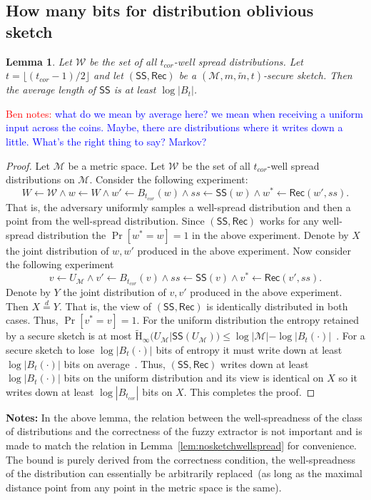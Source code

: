 \documentclass[11pt]{article}
\newcommand{\lemref}[1]{\mbox{Lemma~\ref{#1}}}
\newcommand{\class}[1]{{\ensuremath{\mathsf{#1}}}}
\newcommand{\sketch}{\ensuremath{\class{SS}}\xspace}
\newcommand{\rec}{\ensuremath{\class{Rec}}\xspace}
\newcommand{\Hav}{\tilde{\mathrm{H}}_\infty}
\newtheorem{lemma}[theorem]{Lemma}
\newcommand{\authnote}[2]{{\textcolor{red}{\textsf{#1 notes: }\textcolor{blue}{ #2}}\marginpar{\textcolor{red}{\textbf{!!!!!}}}}}
\newcommand{\authnote}[2]{}
\newcommand{\bnote}[1]{{\authnote{Ben}{#1}}}
\begin{document}
\subsection{How many bits for distribution oblivious sketch} 
\begin{lemma}
Let $\mathcal{W}$ be the set of all $t_{cor}$-well spread distributions.  Let $t = \lfloor (t_{cor}-1)/2\rfloor$ and let $(\sketch, \rec)$ be a $(\mathcal{M}, m, \tilde{m}, t )$-secure sketch.  Then the average length of $\sketch$ is at least $\log |B_{t}|$.
\end{lemma}
\bnote{what do we mean by average here?  we mean when receiving a uniform input across the coins.  Maybe, there are distributions where it writes down a little.  What's the right thing to say?  Markov?}
\begin{proof}
Let $\mathcal{M}$ be a metric space.
Let $\mathcal{W}$ be the set of all $t_{cor}$-well spread distributions on $\mathcal{M}$.  
Consider the following experiment:
\[
W\leftarrow \mathcal{W} \wedge w \leftarrow W \wedge w'\leftarrow B_{t_{cor}}(w) \wedge ss \leftarrow \sketch(w) \wedge w^* \leftarrow \rec(w', ss).
\]
That is, the adversary uniformly samples a well-spread distribution and then a point from the well-spread distribution.  
Since $(\sketch, \rec)$ works for any well-spread distribution the $\Pr[w^* = w] =1 $ in the above experiment.   Denote by $X$ the joint distribution of $w, w'$ produced in the above experiment.  Now consider the following experiment
\[
v \leftarrow U_{\mathcal{M}} \wedge v'\leftarrow B_{t_{cor}}(v) \wedge ss \leftarrow \sketch(v) \wedge v^* \leftarrow \rec(v', ss).
\]
Denote by $Y$ the joint distribution of $v, v'$ produced in the above experiment.  Then $X\overset{d}= Y$.  That is, the view of $(\sketch, \rec)$ is identically distributed in both cases.  Thus, $\Pr[v^* = v] = 1$.  For the uniform distribution the entropy retained by a secure sketch is at most $\Hav(U_{\mathcal{M}} | \sketch(U_{\mathcal{M}})) \le \log |\mathcal{M}| - \log |B_t(\cdot)|$~\cite[Lemma C.1]{DBLP:journals/siamcomp/DodisORS08}.  For a secure sketch to lose $\log |B_t(\cdot)|$ bits of entropy it must write down at least $\log |B_t(\cdot)|$ bits on average~\cite[Lemma 2.2b]{DBLP:journals/siamcomp/DodisORS08}.  Thus, $(\sketch, \rec)$ writes down at least $\log |B_t(\cdot)|$ bits on the uniform distribution and its view is identical on $X$ so it writes down at least $\log |B_{t_{cor}}|$ bits on $X$.  This completes the proof.
\end{proof}
\noindent
\textbf{Notes:} In the above lemma, the relation between the well-spreadness of the class of distributions and the correctness of the fuzzy extractor is not important and is made to match the relation in \lemref{lem:nosketchwellspread} for convenience.  The bound is purely derived from the correctness condition, the well-spreadness of the distribution can essentially be arbitrarily replaced~(as long as the maximal distance point from any point in the metric space is the same).
\end{document}
